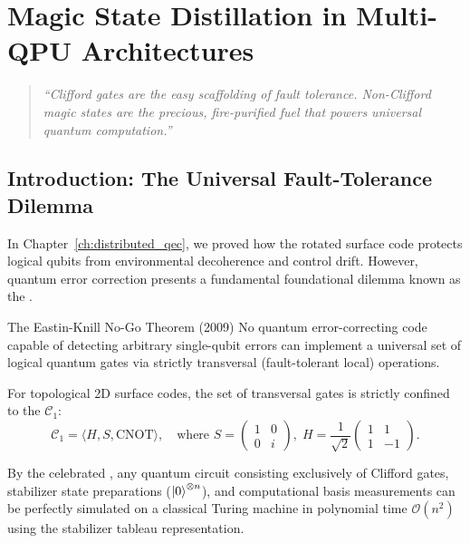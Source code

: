 \chapter{Magic State Distillation in Multi-QPU Architectures}
\label{ch:magic_state_distillation}

\begin{quote}
\textit{``Clifford gates are the easy scaffolding of fault tolerance. Non-Clifford magic states are the precious, fire-purified fuel that powers universal quantum computation.''}
\end{quote}


\section{Introduction: The Universal Fault-Tolerance Dilemma}

In Chapter~\ref{ch:distributed_qec}, we proved how the rotated surface code protects logical qubits from environmental decoherence and control drift. However, quantum error correction presents a fundamental foundational dilemma known as the .

\begin{theorembox}{The Eastin-Knill No-Go Theorem (2009)}
No quantum error-correcting code capable of detecting arbitrary single-qubit errors can implement a universal set of logical quantum gates via strictly transversal (fault-tolerant local) operations.
\end{theorembox}

For topological 2D surface codes, the set of transversal gates is strictly confined to the  $\mathcal{C}_1$:
\begin{equation}
    \mathcal{C}_1 = \langle H, S, \text{CNOT} \rangle, \quad \text{where } S = \begin{pmatrix} 1 & 0 \\ 0 & i \end{pmatrix}, \; H = \frac{1}{\sqrt{2}}\begin{pmatrix} 1 & 1 \\ 1 & -1 \end{pmatrix}.
\end{equation}

By the celebrated , any quantum circuit consisting exclusively of Clifford gates, stabilizer state preparations ($\ket{0}^{\otimes n}$), and computational basis measurements can be perfectly simulated on a classical Turing machine in polynomial time $\mathcal{O}(n^2)$ using the stabilizer tableau representation.


